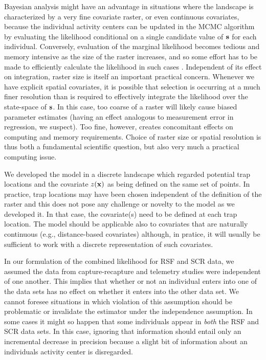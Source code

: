 Bayesian analysis might have an advantage in situations where the
landscape is characterized by a very fine covariate raster, or even
continuous covariates, because the individual activity centers can be
updated in the MCMC algorithm by evaluating the likelihood conditional
on a single candidate value of ${\bf s}$ for each individual.
Conversely, evaluation of the marginal likelihood becomes tedious and
memory intensive as the size of the raster increases, and so some
effort has to be made to efficiently calculate the likelihood in such
cases \citep[e.g., see][]{warton_shepherd:2010}. Independent of its
effect on integration, raster size is itself an important practical
concern.
Whenever we have explicit spatial covariates, it is possible that
selection is occurring at a much finer resolution than is required to
effectively integrate the likelihood over the state-space of ${\bf
  s}$. In this case, too coarse of a raster will likely cause biased
parameter estimates (having an effect analogous to measurement error
in regression, we suspect). Too fine, however, creates concomitant
effects on computing and memory requirements.  Choice of raster size
or spatial resolution is thus both a fundamental scientific question,
but also very much a practical computing issue.

We developed the model in a discrete landscape which regarded
potential trap
locations and the covariate $z({\bf x})$ as being defined on the same
set of points. In practice, trap locations may have been chosen
independent of the definition of the raster and this does not pose any
challenge or novelty to the model as we developed it. In that 
case, the covariate(s) need to be defined  at each trap location. 
The model should be applicable also to covariates that are naturally
continuous (e.g., distance-based covariates) although, in pratice, it
will usually be sufficient to work with a discrete representation of
such covariates. 


In our formulation of the combined likelihood for RSF and SCR data, we
assumed the data from capture-recapture and telemetry studies were
independent of one another. This implies that whether or not an
individual enters into one of the data sets has no effect on whether
it enters into the other data set. We cannot foresee situations in
which violation of this assumption should be problematic or invalidate
the estimator under the independence assumption.  In some cases it
might so happen that some individuals appear in {\it both} the RSF and
SCR data sets. In this case, ignoring that information should entail
only an incremental decrease in precision because a slight bit of
information about an individuals activity center is disregarded.


